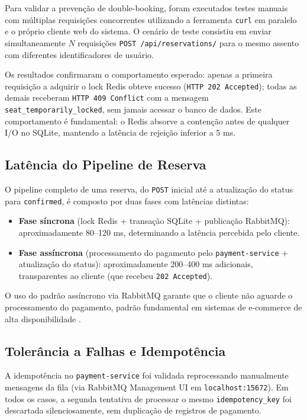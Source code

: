 \documentclass[12pt]{article}
\begin{document}
Para validar a prevenção de double-booking, foram executados testes manuais com
múltiplas requisições concorrentes utilizando a ferramenta \texttt{curl} em paralelo e
o próprio cliente web do sistema. O cenário de teste consistiu em enviar
simultaneamente $N$ requisições \texttt{POST /api/reservations/} para o mesmo assento
com diferentes identificadores de usuário.

Os resultados confirmaram o comportamento esperado: apenas a primeira requisição a
adquirir o lock Redis obteve sucesso (\texttt{HTTP 202 Accepted}); todas as demais
receberam \texttt{HTTP 409 Conflict} com a mensagem
\texttt{seat\_temporarily\_locked}, sem jamais acessar o banco de dados. Este
comportamento é fundamental: o Redis absorve a contenção antes de qualquer I/O no
SQLite, mantendo a latência de rejeição inferior a 5 ms.

\subsection{Latência do Pipeline de Reserva}

O pipeline completo de uma reserva, do \texttt{POST} inicial até a atualização do
status para \texttt{confirmed}, é composto por duas fases com latências distintas:

\begin{itemize}
  \item \textbf{Fase síncrona} (lock Redis + transação SQLite + publicação RabbitMQ):
        aproximadamente 80--120 ms, determinando a latência percebida pelo cliente.
  \item \textbf{Fase assíncrona} (processamento do pagamento pelo \texttt{payment-service}
        + atualização do status): aproximadamente 200--400 ms adicionais, transparentes
        ao cliente (que recebeu \texttt{202 Accepted}).
\end{itemize}

O uso do padrão assíncrono via RabbitMQ garante que o cliente não aguarde o
processamento do pagamento, padrão fundamental em sistemas de e-commerce de alta
disponibilidade \cite{kleppmann2017}.

\subsection{Tolerância a Falhas e Idempotência}

A idempotência no \texttt{payment-service} foi validada reprocessando manualmente
mensagens da fila (via RabbitMQ Management UI em \texttt{localhost:15672}). Em todos
os casos, a segunda tentativa de processar o mesmo \texttt{idempotency\_key} foi
descartada silenciosamente, sem duplicação de registros de pagamento.
\end{document}
